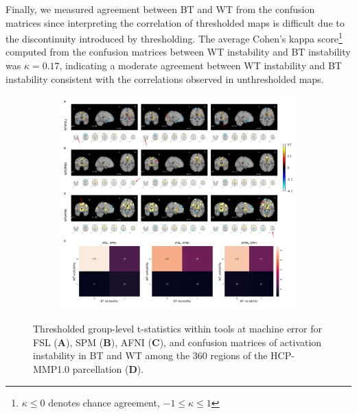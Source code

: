 \documentclass[11pt,onecolumn]{article}
\begin{document}
Finally, we measured agreement between BT and WT from the confusion
matrices since interpreting the correlation of thresholded maps is
difficult due to the discontinuity introduced by thresholding. 
The average Cohen's kappa score\footnote{$\kappa \leq 0$ denotes chance agreement, $-1 \leq \kappa \leq 1$}
computed from the confusion matrices between WT instability and BT instability was $\kappa=0.17$, indicating
a moderate agreement between WT instability and BT instability consistent with the correlations observed in 
unthresholded maps.


\begin{figure}[ht]
  \begin{subfigure}[ht]{\textwidth}
    \centering
    \includegraphics[width=\textwidth]{figures/act_deact-marked.pdf}
  \end{subfigure}
  \centering
  \caption{Thresholded group-level t-statistics within tools at machine error for FSL (\textbf{A}),
    SPM (\textbf{B}), AFNI (\textbf{C}), and confusion matrices of activation instability
    in BT and WT among the 360 regions of the HCP-MMP1.0 parcellation (\textbf{D}).}
  \label{fig:thresh-maps}
\end{figure}
\end{document}
